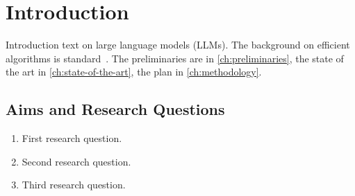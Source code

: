 \chapter{Introduction}
\label{ch:introduction}

Introduction text on large language models (LLMs)\label{abbr:llm}.
The background on efficient algorithms is standard~\cite{Cormen2022}.
The preliminaries are in \cref{ch:preliminaries}, the state of the art in \cref{ch:state-of-the-art}, the plan in \cref{ch:methodology}.

\section{Aims and Research Questions}
\label{sec:aims}

\begin{enumerate}
\item First research question.
\item Second research question.
\item Third research question.
\end{enumerate}
